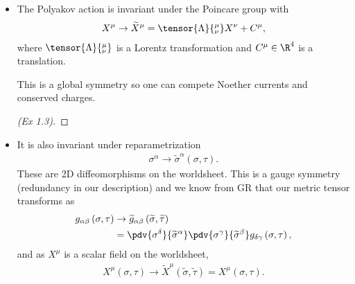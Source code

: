 \begin{itemize}
    \item The Polyakov action is invariant under the Poincare group with
    \begin{align}
        X^{\mu} \to \widetilde{X}^{\mu} = \tensor{\Lambda}{^{\mu}_\nu} X^{\nu} + C^{\mu}
    ,\end{align}
    where $\tensor{\Lambda}{^{\mu}_\nu}$ is a Lorentz transformation and $C^{\mu} \in \R^{4}$ is a translation.
    
    This is a global symmetry so one can compete Noether currents and conserved charges.
    \begin{proof}[ (Ex 1.3)]
        
    \end{proof}
    \item It is also invariant under reparametrization
        \begin{align}
            \sigma^{\alpha} \to \widetilde{\sigma}^{\alpha}\left( \sigma, \tau \right) 
        .\end{align}
        These are 2D diffeomorphisms on the worldsheet.
        This is a gauge symmetry (redundancy in our description) and we know from GR that our metric tensor transforms as
        \begin{align}
            g_{\alpha \beta} \left( \sigma ,\tau \right) &\to \widetilde{g}_{\alpha \beta}\left( \widetilde{\sigma},\widetilde{\tau} \right) \\
            &= \pdv{\sigma^{\delta}}{\widetilde{\sigma}^{\alpha}} \pdv{\sigma^{\gamma}}{\widetilde{\sigma}^{\beta}} g_{\delta \gamma}\left( \sigma, \tau \right) 
        ,\end{align}
        and as $X^{\mu}$ is a scalar field on the worldsheet, 
        \begin{align}
            X^{\mu}\left( \sigma, \tau \right) \to \widetilde{X}^{\mu}\left( \widetilde{\sigma}, \widetilde{\tau} \right) = X^{\mu}\left( \sigma,\tau \right) 
        .\end{align}


\end{itemize}
